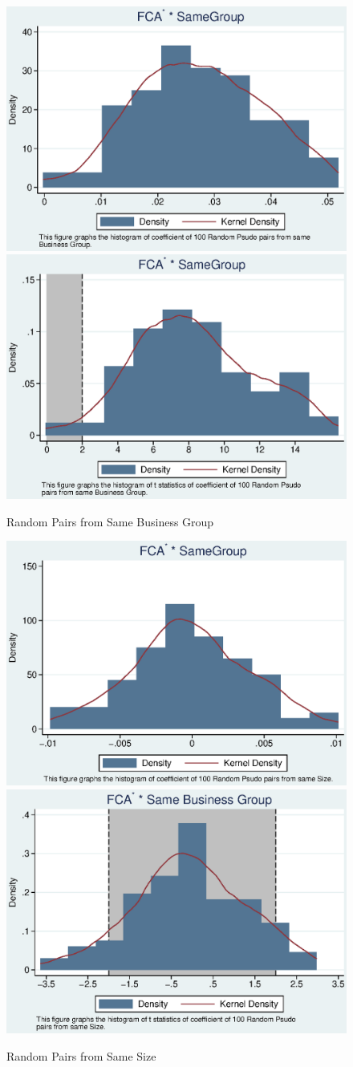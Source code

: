 \documentclass[12pt, a4paper]{article}
\begin{document}
		
		\begin{figure}
			\centering
			\caption{Random Pairs from Same Business Group}
			\includegraphics[width=0.45\linewidth]{BusinessPseudoSBFCA.eps}
			\includegraphics[width=0.45\linewidth]{BusinessPseudoSBFCA_t.eps}
		\end{figure}







		\begin{figure}
			\centering
			\caption{Random Pairs from Same Size}
			\includegraphics[width=0.45\linewidth]{SizePseudoSBFCA.eps}
			\includegraphics[width=0.45\linewidth]{SizePseudoSBFCA_t.eps}
		\end{figure}
\end{document}
